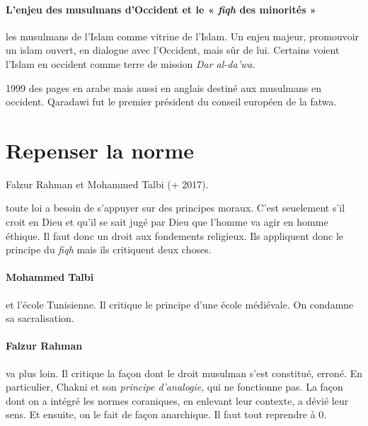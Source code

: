   
    
    \paragraph{L'enjeu des musulmans d'Occident et le « \emph{fiqh} des minorités »}
    les musulmans de l'Islam comme vitrine de l'Islam.
    Un enjeu majeur, promouvoir un islam ouvert, en dialogue avec l'Occident, mais sûr de lui.
    Certains voient l'Islam en occident comme terre de mission \emph{Dar al-da'wa}. 
    
    \begin{Ex}
     1999 des pages en arabe mais aussi en anglais destiné aux musulmans en occident. 
    Qaradawi fut le premier président du conseil européen de la fatwa.
    \end{Ex}
    
 \section{Repenser la
  norme}   
    Falzur Rahman et Mohammed Talbi (+ 2017).
    
    toute loi a besoin de s'appuyer sur des principes moraux. C'est seuelement s'il croit en Dieu et qu'il se sait jugé par Dieu que l'homme va agir en homme éthique.
    Il faut donc un droit aux fondements religieux. 
    Ils appliquent donc le principe du \textit{fiqh} mais ils critiquent deux choses.
  
  \paragraph{Mohammed Talbi} et l'école Tunisienne. Il critique le principe d'une école médiévale. On condamne sa sacralisation.  
  
  \paragraph{Falzur Rahman} va plus loin. Il critique la façon dont le droit musulman s'est constitué, erroné. En particulier, Chakni et son \textit{principe d'analogie}, qui ne fonctionne pas. La façon dont on a intégré les normes coraniques, en enlevant leur contexte, a dévié leur sens. Et ensuite, on le fait de façon anarchique. Il faut tout reprendre à 0.
  
